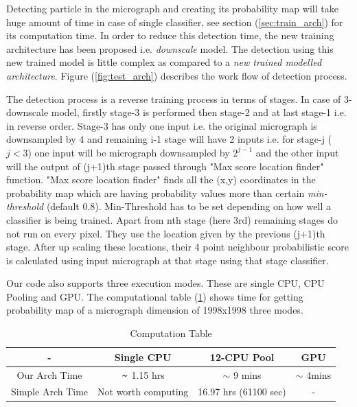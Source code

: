 \documentclass[twoside]{iitbreport}
\begin{document}
Detecting particle in the micrograph and creating its probability map will take huge amount of time in case of single classifier, see section (\ref{sec:train_arch}) for its computation time. In order to reduce this detection time, the new training architecture has been proposed i.e. \textit{downscale} model. The detection using this new trained model is little complex as compared to a  \textit{new trained modelled architecture}. Figure (\ref{fig:test_arch}) describes the work flow of detection process.

The detection process is a reverse training process in terms of stages. In case of 3-downscale model, firstly stage-3 is performed then stage-2 and at last stage-1 i.e. in reverse order. Stage-3 has only one input i.e. the original micrograph is downsampled by 4 and remaining i-1 stage will have 2 inputs i.e. for stage-j ($j<3$) one input will be micrograph downsampled by $2^{j-1}$ and the other input will the output of (j+1)th stage passed through "Max score location finder" function. "Max score location finder" finds all the (x,y) coordinates in the probability map which are having probability values more than certain \textit{min-threshold} (default 0.8). Min-Threshold has to be set depending on how well a classifier is being trained.  Apart from nth stage (here 3rd) remaining stages do not run on every pixel. They use the location given by the previous (j+1)th stage. After up scaling these locations, their 4 point neighbour probabilistic score is calculated using input micrograph at that stage using that stage classifier. 


Our code also supports three execution modes. These are single CPU, CPU Pooling and GPU. The computational table (\ref{tbl:computation_tbl}) shows time for getting probability map of a micrograph dimension of 1998x1998 three modes.

\begin{center}
\begin{table}[H]
    \begin{tabular}{||c|c|c|c||} 
        \hline \hline
      -     & Single CPU & 12-CPU Pool & GPU \\ [0.5ex] 
        \hline\hline
        Our Arch Time & $\thicksim$ 1.15 hrs & $\sim$ 9 mins & $\sim$ 4mins \\ \hline
        Simple Arch Time & Not worth computing&  16.97 hrs (61100 sec)  & - \\ 
        \hline
        \hline
    \end{tabular}
    \caption{Computation Table}
    \label{tbl:computation_tbl}
\end{table}
\end{center}
\end{document}
